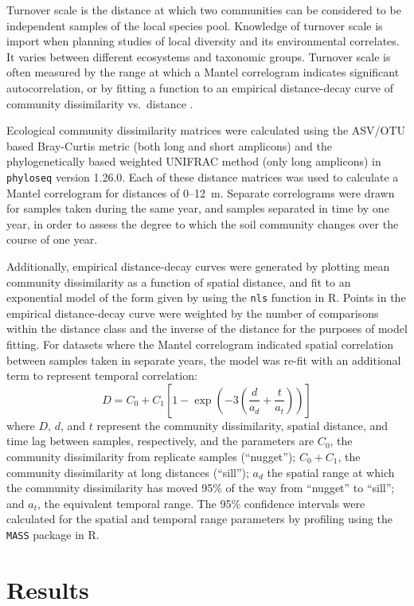 \documentclass[
  12pt,
]{article}
\begin{document}
Turnover scale is the distance at which two communities can be considered to be independent samples of the local species pool.
Knowledge of turnover scale is import when planning studies of local diversity and its environmental correlates.
It varies between different ecosystems and taxonomic groups.
Turnover scale is often measured by the range at which a Mantel correlogram indicates significant autocorrelation, or by fitting a function to an empirical distance-decay curve of community dissimilarity vs.~distance \autocite{legendre2012}.

Ecological community dissimilarity matrices were calculated using the ASV/OTU based Bray-Curtis metric (both long and short amplicons) and the phylogenetically based weighted UNIFRAC method (only long amplicons) in \texttt{phyloseq} version 1.26.0.
Each of these distance matrices was used to calculate a Mantel correlogram for distances of 0--12~m.
Separate correlograms were drawn for samples taken during the same year, and samples separated in time by one year, in order to assess the degree to which the soil community changes over the course of one year.

Additionally, empirical distance-decay curves were generated by plotting mean community dissimilarity as a function of spatial distance, and fit to an exponential model of the form given by \textcite{legendre2012} using the \texttt{nls} function in R.
Points in the empirical distance-decay curve were weighted by the number of comparisons within the distance class and the inverse of the distance for the purposes of model fitting.
For datasets where the Mantel correlogram indicated spatial correlation between samples taken in separate years, the model was re-fit with an additional term to represent temporal correlation:
\[D = C_0 + C_1\left[1 - \exp\left(-3  \left(\frac{d}{a_d} + \frac{t}{a_t}\right)\right)\right]\]
where \(D\), \(d\), and \(t\) represent the community dissimilarity, spatial distance, and time lag between samples, respectively, and the parameters are \(C_0\), the community dissimilarity from replicate samples (``nugget''); \(C_0 + C_1\), the community dissimilarity at long distances (``sill''); \(a_d\) the spatial range at which the community dissimilarity has moved 95\% of the way from ``nugget'' to ``sill''; and \(a_t\), the equivalent temporal range.
The 95\% confidence intervals were calculated for the spatial and temporal range parameters by profiling using the \texttt{MASS} package in R.

\hypertarget{results}{%
\section{Results}\label{results}}
\end{document}
